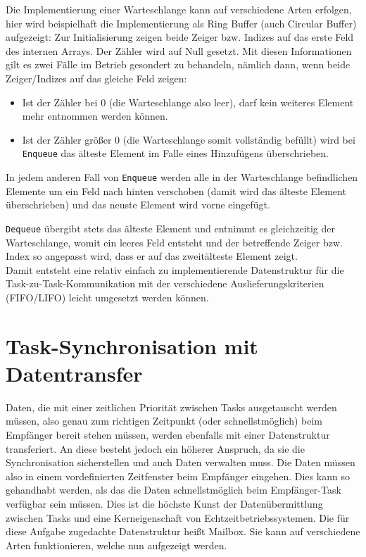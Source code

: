 \documentclass{llncs}
\begin{document}
Die Implementierung einer Warteschlange kann auf verschiedene Arten erfolgen, hier wird beispielhaft die Implementierung als Ring Buffer (auch Circular Buffer) aufgezeigt: Zur Initialisierung zeigen beide Zeiger bzw. Indizes auf das erste Feld des internen Arrays. Der Zähler wird auf Null gesetzt. Mit diesen Informationen gilt es zwei Fälle im Betrieb gesondert zu behandeln, nämlich dann, wenn beide Zeiger/Indizes auf das gleiche Feld zeigen:
\begin{itemize}
	\item Ist der Zähler bei $0$ (die Warteschlange also leer), darf kein weiteres Element mehr entnommen werden können.
	\item Ist der Zähler größer $0$ (die Warteschlange somit vollständig befüllt) wird bei \texttt{Enqueue} das älteste Element im Falle eines Hinzufügens überschrieben.
\end{itemize}
In jedem anderen Fall von \texttt{Enqueue} werden alle in der Warteschlange befindlichen Elemente um ein Feld nach hinten verschoben (damit wird das älteste Element überschrieben) und das neuste Element wird vorne eingefügt.

\texttt{Dequeue} übergibt stets das älteste Element und entnimmt es gleichzeitig der Warteschlange, womit ein leeres Feld entsteht und der betreffende Zeiger bzw. Index so angepasst wird, dass er auf das zweitälteste Element zeigt.\\

Damit entsteht eine relativ einfach zu implementierende Datenstruktur für die Task-zu-Task-Kommunikation mit der verschiedene Auslieferungskriterien (FIFO/LIFO) leicht umgesetzt werden können.

\section{Task-Synchronisation mit Datentransfer}
\label{sub:Task_Synchronisation_Datentransfer}
Daten, die mit einer zeitlichen Priorität zwischen Tasks ausgetauscht werden müssen, also genau zum richtigen Zeitpunkt (oder schnellstmöglich) beim Empfänger bereit stehen müssen, werden ebenfalls mit einer Datenstruktur transferiert. An diese besteht jedoch ein höherer Anspruch, da sie die Synchronisation sicherstellen und auch Daten verwalten muss. Die Daten müssen also in einem vordefinierten Zeitfenster beim Empfänger eingehen. Dies kann so gehandhabt werden, als das die Daten schnellstmöglich beim Empfänger-Task verfügbar sein müssen. Dies ist die höchste Kunst der Datenübermittlung zwischen Tasks und eine Kerneigenschaft von Echtzeitbetriebssystemen. Die für diese Aufgabe zugedachte Datenstruktur heißt Mailbox. Sie kann auf verschiedene Arten funktionieren, welche nun aufgezeigt werden.
\end{document}
